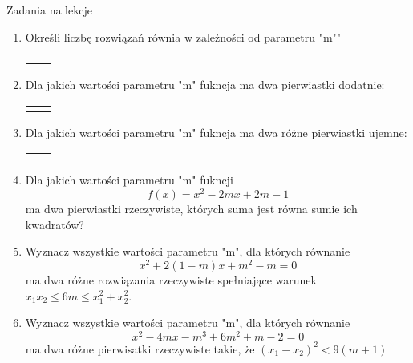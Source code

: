 \documentclass[12pt,a4paper]{article}
\begin{document}
	
	\begin{center}
		\LARGE Zadania na lekcje
	\end{center}
	\vspace{1.5cm}
	
	\begin{enumerate}[1.]
		\item Określi liczbę rozwiązań równia w zależności od parametru "m""
		\begin{enumerate}[a)] \begin{tabular}{p{7cm} p{7cm}} 
				\item $(m-3)x^2+(m-2)x+1=0$& \vspace{0.4cm} 	\item $(2m-3)x^2+4mx+m-1=0$ \\
		\end{tabular} \end{enumerate}
	
		\item Dla jakich wartości parametru "m" fukncja ma dwa pierwiastki dodatnie:
		\begin{enumerate}[a)] \begin{tabular}{p{7cm} p{7cm}} 
				\item $f(x)=x^2+2(m-1)x+2m+1$& \vspace{0.4cm} 	\item $f(x)=x^2+(m-5)x+m-2$ \\
		\end{tabular} \end{enumerate}
	
		\item Dla jakich wartości parametru "m" fukncja ma dwa różne pierwiastki ujemne:
		\begin{enumerate}[a)] \begin{tabular}{p{7cm} p{7cm}} 
				\item $f(x)=x^2+5mx+4m^2-3m$& \vspace{0.4cm} 	\item $f(x)=(m-2)x^2-2mx+m^2-3m+4$ \\
		\end{tabular} \end{enumerate}
	
		\item Dla jakich wartości parametru "m" fukncji
		$$f(x)=x^2-2mx+2m-1$$
		ma dwa pierwiastki rzeczywiste, których suma jest równa sumie ich kwadratów?
		
		\item Wyznacz wszystkie wartości parametru "m", dla których równanie
		$$x^2+2(1-m)x+m^2-m=0$$
		ma dwa różne rozwiązania rzeczywiste spełniające warunek $x_1x_2\leq 6m \leq x_1^2+x_2^2 $.
		
		\item Wyznacz wszystkie wartości parametru "m", dla których równanie
		$$x^2-4mx-m^3+6m^2+m-2=0$$
		ma dwa różne pierwisatki rzeczywiste takie, że $(x_1-x_2)^2<9(m+1)$
	\end{enumerate}
	
\end{document}
